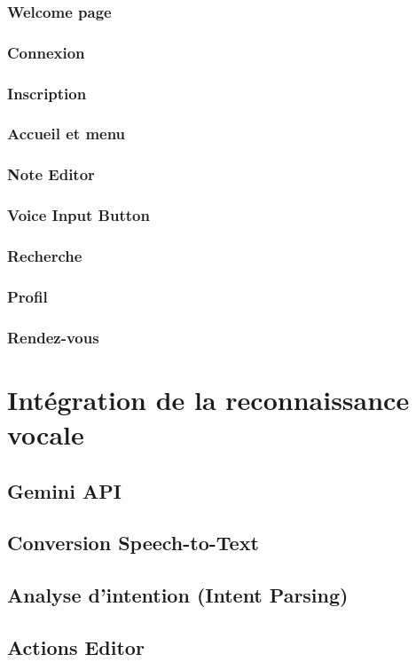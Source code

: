 \subsubsection{Welcome page}
\subsubsection{Connexion}
\subsubsection{Inscription}
\subsubsection{Accueil et menu}
\subsubsection{Note Editor}
\subsubsection{Voice Input Button}
\subsubsection{Recherche}
\subsubsection{Profil}
\subsubsection{Rendez-vous}

\section{Intégration de la reconnaissance vocale}
\subsection{Gemini API}
\subsection{Conversion Speech-to-Text}
\subsection{Analyse d'intention (Intent Parsing)}
\subsection{Actions Editor}

